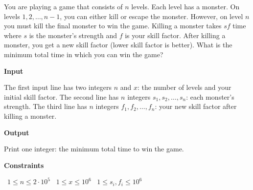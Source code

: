 You are playing a game that consists of $n$ levels. Each level has a monster. On levels $1,2,\dots,n-1$, you can either kill or escape the monster. However, on level $n$ you must kill the final monster to win the game.
Killing a monster takes $sf$ time where $s$ is the monster's strength and $f$ is your skill factor. After killing a monster, you get a new skill factor  (lower skill factor is better). What is the minimum total time in which you can win the game?

\vspace{0.3cm}\noindent\textbf{Input}

The first input line has two integers $n$ and $x$: the number of levels and your initial skill factor.
The second line has $n$ integers $s_1,s_2,\dots,s_n$: each monster's strength.
The third line has $n$ integers $f_1,f_2,\dots,f_n$: your new skill factor after killing a monster.

\vspace{0.3cm}\noindent\textbf{Output}

Print one integer: the minimum total time to win the game.

\vspace{0.3cm}\noindent\textbf{Constraints}

\textbullet\ $1 \le n \le 2 \cdot 10^5$
\textbullet\ $1 \le x \le 10^6$
\textbullet\ $1 \le s_i, f_i \le 10^6$